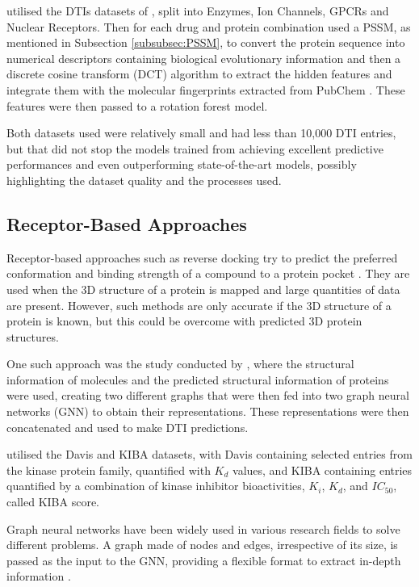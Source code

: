 \citet{Wang2020} utilised the DTIs datasets of \citet{Yamanishi2008}, split into Enzymes, Ion Channels, GPCRs and Nuclear Receptors. Then for each drug and protein combination used a PSSM, as mentioned in Subsection \ref{subsubsec:PSSM}, to convert the protein sequence into numerical descriptors containing biological evolutionary information and then a discrete cosine transform (DCT) algorithm to extract the hidden features and integrate them with the molecular fingerprints extracted from PubChem \citep{PubChem}. These features were then passed to a rotation forest model. 

Both datasets used were relatively small and had less than 10,000 DTI entries, but that did not stop the models trained from achieving excellent predictive performances and even outperforming state-of-the-art models, possibly highlighting the dataset quality and the processes used.

\subsection{Receptor-Based Approaches}
\label{subsec:Receptor_Based_Approaches}

Receptor-based approaches such as reverse docking try to predict the preferred conformation and binding strength of a compound to a protein pocket \citep{Shar2016}. They are used when the 3D structure of a protein is mapped and large quantities of data are present. However, such methods are only accurate if the 3D structure of a protein is known, but this could be overcome with predicted 3D protein structures.

One such approach was the study conducted by \citet{Jiang2020}, where the structural information of molecules and the predicted structural information of proteins were used, creating two different graphs that were then fed into two graph neural networks (GNN) to obtain their representations. These representations were then concatenated and used to make DTI predictions.

\citet{Jiang2020} utilised the Davis \citep{Davis_Dataset} and KIBA \citep{KIBA_Dataset_1, KIBA_Dataset_2} datasets, with Davis containing selected entries from the kinase protein family, quantified with $K_d$ values, and KIBA containing entries quantified by a combination of kinase inhibitor bioactivities, $K_i$, $K_d$, and $IC_{50}$, called KIBA score.

Graph neural networks have been widely used in various research fields to solve different problems. A graph made of nodes and edges, irrespective of its size, is passed as the input to the GNN, providing a flexible format to extract in-depth information \citep{Jiang2020}. 

